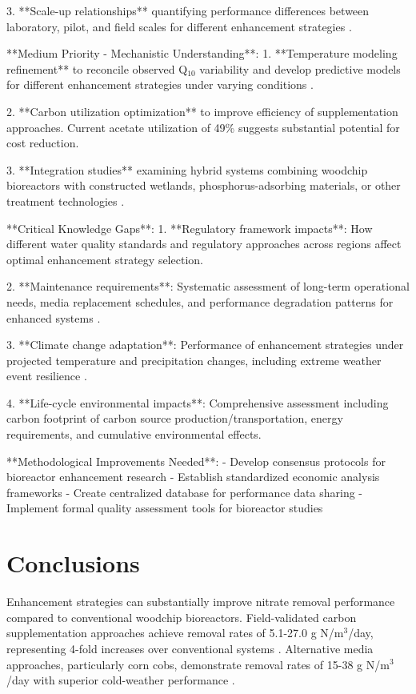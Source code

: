 \documentclass[12pt,a4paper]{article}
\begin{document}
3. **Scale-up relationships** quantifying performance differences between laboratory, pilot, and field scales for different enhancement strategies \citep{RN312}.

**Medium Priority - Mechanistic Understanding**:
1. **Temperature modeling refinement** to reconcile observed Q$_{10}$ variability and develop predictive models for different enhancement strategies under varying conditions \citep{RN242, RN258}.

2. **Carbon utilization optimization** to improve efficiency of supplementation approaches. Current acetate utilization of 49\% \citep{RN196} suggests substantial potential for cost reduction.

3. **Integration studies** examining hybrid systems combining woodchip bioreactors with constructed wetlands, phosphorus-adsorbing materials, or other treatment technologies \citep{RN282, RN291}.

**Critical Knowledge Gaps**:
1. **Regulatory framework impacts**: How different water quality standards and regulatory approaches across regions affect optimal enhancement strategy selection.

2. **Maintenance requirements**: Systematic assessment of long-term operational needs, media replacement schedules, and performance degradation patterns for enhanced systems \citep{RN958}.

3. **Climate change adaptation**: Performance of enhancement strategies under projected temperature and precipitation changes, including extreme weather event resilience \citep{RN1181}.

4. **Life-cycle environmental impacts**: Comprehensive assessment including carbon footprint of carbon source production/transportation, energy requirements, and cumulative environmental effects.

**Methodological Improvements Needed**:
- Develop consensus protocols for bioreactor enhancement research
- Establish standardized economic analysis frameworks
- Create centralized database for performance data sharing
- Implement formal quality assessment tools for bioreactor studies

\section{Conclusions}

Enhancement strategies can substantially improve nitrate removal performance compared to conventional woodchip bioreactors. Field-validated carbon supplementation approaches achieve removal rates of 5.1-27.0 g N/m$^3$/day, representing 4-fold increases over conventional systems \citep{RN632}. Alternative media approaches, particularly corn cobs, demonstrate removal rates of 15-38 g N/m$^3$/day with superior cold-weather performance \citep{RN350, RN624}.
\end{document}
